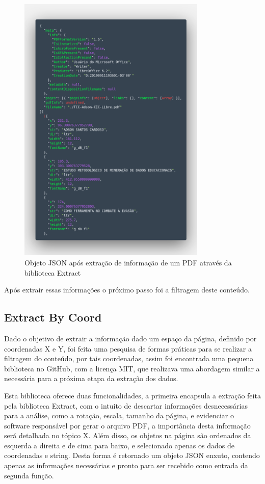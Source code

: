 \begin{figure}
\centering
\captionsetup{justification   = raggedright,
              singlelinecheck = false}
\caption{Objeto JSON após extração de informação de um PDF através da biblioteca Extract}\label{pdfExtract}
\includegraphics[width=0.8\textwidth]{figs/pdfExtract.png}
\end{figure}

Após extrair essas informações o próximo passo foi a filtragem deste conteúdo.

\subsection{Extract By Coord}

Dado o objetivo de extrair a informação dado um espaço da página, definido por coordenadas X e Y, foi feita uma pesquisa de formas práticas para se realizar a filtragem do conteúdo, por tais coordenadas, assim foi encontrada uma pequena biblioteca no GitHub, com a licença MIT, que realizava uma abordagem similar a necessária para a próxima etapa da extração dos dados.

Esta biblioteca oferece duas funcionalidades, a primeira encapsula a extração feita pela biblioteca Extract, com o intuito de descartar informações desnecessárias para a análise, como a rotação, escala, tamanho da página, e evidenciar o software responsável por gerar o arquivo PDF, a importância desta informação será detalhada no tópico X. Além disso, os objetos na página são ordenados da esquerda a direita e de cima para baixo, e selecionado apenas os dados de coordenadas e string. Desta forma é retornado um objeto JSON enxuto, contendo apenas as informações necessárias e pronto para ser recebido como entrada da segunda função. 

